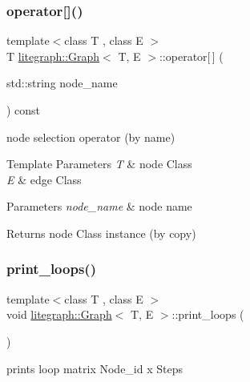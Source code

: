 \subsubsection{\texorpdfstring{operator[]()}{operator[]()}\hspace{0.1cm}{\footnotesize\ttfamily [4/4]}}
{\footnotesize\ttfamily template$<$class T , class E $>$ \\
T \hyperlink{classlitegraph_1_1Graph}{litegraph\+::\+Graph}$<$ T, E $>$\+::operator\mbox{[}$\,$\mbox{]} (\begin{DoxyParamCaption}\item[{std\+::string}]{node\+\_\+name }\end{DoxyParamCaption}) const}



node selection operator (by name) 


\begin{DoxyTemplParams}{Template Parameters}
{\em T} & node Class \\
\hline
{\em E} & edge Class \\
\hline
\end{DoxyTemplParams}

\begin{DoxyParams}{Parameters}
{\em node\+\_\+name} & node name\\
\hline
\end{DoxyParams}
\begin{DoxyReturn}{Returns}
node Class instance (by copy) 
\end{DoxyReturn}
\mbox{\label{classlitegraph_1_1Graph_a1c505004169416bf4ede9e6ed3856ae0}} 
\subsubsection{\texorpdfstring{print\+\_\+loops()}{print\_loops()}}
{\footnotesize\ttfamily template$<$class T , class E $>$ \\
void \hyperlink{classlitegraph_1_1Graph}{litegraph\+::\+Graph}$<$ T, E $>$\+::print\+\_\+loops (\begin{DoxyParamCaption}{ }\end{DoxyParamCaption})}



prints loop matrix Node\+\_\+id x Steps 


